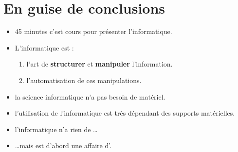 \section[Conclusion]{En guise de conclusions}
\begin{frame}
	\begin{itemize}
		\item 45 minutes c'est cours pour présenter l'informatique.
		\item L'informatique est :
		\begin{enumerate}
			\item l'art de \textbf{structurer} et \textbf{manipuler} l'information.
			\item l'automatisation de ces manipulations.
		\end{enumerate}
		\item {} la science informatique n'a pas besoin de matériel.
		\item {} l'utilisation de l'informatique est très dépendant des supports matérielles.
		\item {} l'informatique n'a rien de  \ldots
		\item \ldots mais est d'abord une affaire d'.
	\end{itemize}
\end{frame}